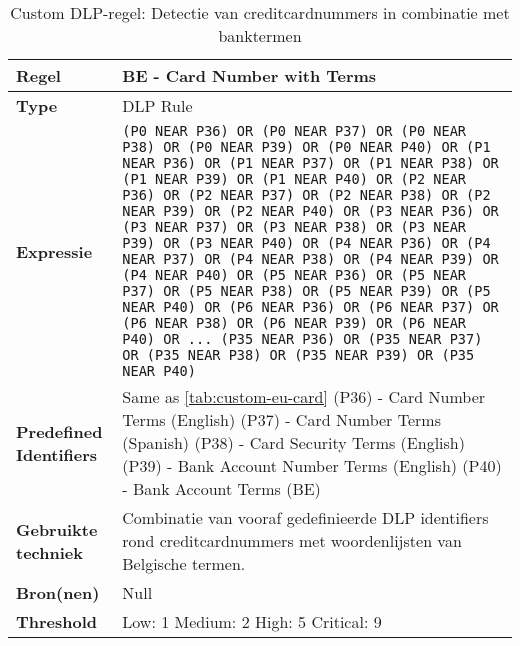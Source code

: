 \begin{table}[h]
    \centering
    \small
    \scriptsize
    \begin{tabular}{p{4cm} p{10cm}}
        \toprule
        \textbf{Regel} & BE - Card Number with Terms \\
        \midrule
        \textbf{Type} & DLP Rule \\
        \textbf{Expressie} & \texttt{(P0 NEAR P36) OR (P0 NEAR P37) OR (P0 NEAR P38) OR (P0 NEAR P39) OR (P0 NEAR P40) OR (P1 NEAR P36) OR (P1 NEAR P37) OR (P1 NEAR P38) OR (P1 NEAR P39) OR (P1 NEAR P40) OR (P2 NEAR P36) OR (P2 NEAR P37) OR (P2 NEAR P38) OR (P2 NEAR P39) OR (P2 NEAR P40) OR (P3 NEAR P36) OR (P3 NEAR P37) OR (P3 NEAR P38) OR (P3 NEAR P39) OR (P3 NEAR P40) OR (P4 NEAR P36) OR (P4 NEAR P37) OR (P4 NEAR P38) OR (P4 NEAR P39) OR (P4 NEAR P40) OR (P5 NEAR P36) OR (P5 NEAR P37) OR (P5 NEAR P38) OR (P5 NEAR P39) OR (P5 NEAR P40) OR (P6 NEAR P36) OR (P6 NEAR P37) OR (P6 NEAR P38) OR (P6 NEAR P39) OR (P6 NEAR P40) OR \newline
        ... \newline
        (P35 NEAR P36) OR (P35 NEAR P37) OR (P35 NEAR P38) OR (P35 NEAR P39) OR (P35 NEAR P40)} \\
        \textbf{Predefined Identifiers} & 
        Same as \ref{tab:custom-eu-card} \newline
        (P36) - Card Number Terms (English) \newline
        (P37) - Card Number Terms (Spanish) \newline
        (P38) - Card Security Terms (English) \newline
        (P39) - Bank Account Number Terms (English) \newline
        (P40) - Bank Account Terms (BE) \\
        \textbf{Gebruikte techniek} & Combinatie van vooraf gedefinieerde DLP identifiers rond creditcardnummers met woordenlijsten van Belgische termen. \\
        \textbf{Bron(nen)} & Null \\
        \textbf{Threshold} & Low: 1 \quad Medium: 2 \quad High: 5 \quad Critical: 9 \\
        \bottomrule
    \end{tabular}
    \caption{Custom DLP-regel: Detectie van creditcardnummers in combinatie met banktermen}
    \label{tab:custom-eu-card-terms}
\end{table}



